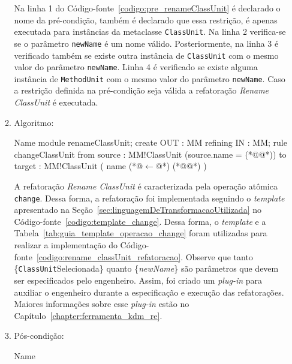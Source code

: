 \begin{enumerate}
\begin{enumerate}
Na linha 1 do Código-fonte~\ref{codigo:pre_renameClassUnit} é declarado o nome da pré-condição, também é declarado que essa restrição, é apenas executada para instâncias da metaclasse \texttt{ClassUnit}. Na linha 2 verifica-se se o parâmetro \texttt{newName} é um nome válido. Posteriormente, na linha 3 é verificado também se existe outra instância de \texttt{ClassUnit} com o mesmo valor do parâmetro \texttt{newName}. Linha 4 é verificado se existe alguma instância de \texttt{MethodUnit} com o mesmo valor do parâmetro \texttt{newName}. Caso a restrição definida na pré-condição seja válida a refatoração \textit{Rename ClassUnit} é executada.
			\item Algoritmo: 
	\begin{codigo}[caption={[ATL representando a refatoração \textit{Rename ClassUnit}.] ATL da refatoração \textit{Rename ClassUnit}.},escapeinside={(*@}{@*)}, basicstyle=\footnotesize, label={codigo:rename_classUnit_refatoracao}, language=ATL]{Name}
module renameClassUnit;
create OUT : MM refining IN : MM;
rule changeClassUnit {
	from
		source : MM!ClassUnit (source.name = (*@@*))
	to 
		target : MM!ClassUnit (
			name (*@$\leftarrow$@*) (*@@*)
		)
}
\end{codigo}
A refatoração \textit{Rename ClassUnit} é caracterizada pela operação atômica \texttt{change}. Dessa forma, a refatoração foi implementada seguindo o \textit{template} apresentado na Seção~\ref{sec:linguagemDeTransformacaoUtilizada} no Código-fonte~\ref{codigo:template_change}. Dessa forma, o \textit{template} e a Tabela~\ref{tab:guia_template_operacao_change} foram utilizadas para realizar a implementação do Código-fonte~\ref{codigo:rename_classUnit_refatoracao}. Observe que tanto \{\texttt{ClassUnit}Selecionada\} quanto \{\textit{newName}\} são parâmetros que devem ser especificados pelo engenheiro. Assim, foi criado um \textit{plug-in} para auxiliar o engenheiro durante a especificação e execução das refatorações. Maiores informações sobre esse \textit{plug-in} estão no Capítulo~\ref{chapter:ferramenta_kdm_re}.     
			\item Pós-condição:
			 \begin{codigo}[caption={[OCL representando a pós-condição da refatoração \textit{Rename ClassUnit}.] Pós-condição da refatoração \textit{Rename ClassUnit}.},escapeinside={(*@}{@*)}, basicstyle=\footnotesize, label={codigo:pos_condicao_rename_classUnit}, language=OCL]{Name}

\end{codigo}
\end{enumerate}
\end{enumerate}

